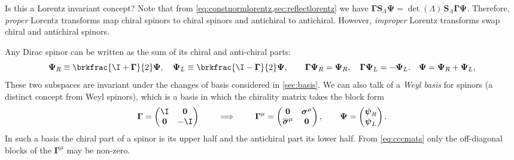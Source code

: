 \documentclass[11pt]{article}
\newcommand{\Gammab}{\boldsymbol{\Gamma}}
\renewcommand{\S}{\mathbf{S}}
\newcommand{\sigmab}{\boldsymbol{\sigma}}
\newcommand{\psib}{\boldsymbol{\psi}}
\newcommand{\Psib}{\boldsymbol{\Psi}}
\begin{document}
Is this a Lorentz invariant concept?
Note that from \cref{eq:constnormlorentz,sec:reflectlorentz} we have \(\Gammab \S_\Lambda \Psib = \det (\Lambda)\, \S_\Lambda \Gammab \Psib\).
Therefore, \emph{proper} Lorentz transforms map chiral spinors to chiral spinors and antichiral to antichiral.
However, \emph{improper} Lorentz transforms swap chiral and antichiral spinors.

Any Dirac spinor can be written as the sum of its chiral and anti-chiral parts:
%
\begin{equation}\label{eq:Weylanti}
  \Psib_R \equiv \brkfrac{\I+\Gammab}{2} \Psib,
  \quad
  \Psib_L \equiv \brkfrac{\I-\Gammab}{2} \Psib,
  \qquad
  \Gammab \Psib_R = \Psib_R,
  \quad
  \Gammab \Psib_L = - \Psib_L.
  \quad
  \Psib = \Psib_R + \Psib_L,
\end{equation}
%
These two subspaces are invariant under the changes of basis considered in \cref{sec:basis}.
We can also talk of a \emph{Weyl basis} for spinors (a distinct concept from Weyl spinors), which is a basis in which the chirality matrix takes the block form
%
\begin{equation}\label{eq:weylbasis}
  \Gammab = \begin{pmatrix}
              \I         & \mathbf{0} \\
              \mathbf{0} & -\I        \\
            \end{pmatrix}
  \qquad
  \implies
  \qquad
  \Gammab^\mu = \begin{pmatrix}
                  \mathbf{0} & \sigmab^\mu \\
                  \overline{\sigmab}^\mu & \mathbf{0} \\
                \end{pmatrix}
  ,
  \qquad
  \Psib = \begin{pmatrix}
            \psib_R \\
            \psib_L \\
          \end{pmatrix}
  .
\end{equation}
%
In such a basis the chiral part of a spinor is its upper half and the antichiral part its lower half.
From \cref{eq:cccmats} only the off-diagonal blocks of the \(\Gammab^\mu\) may be non-zero.
\end{document}
